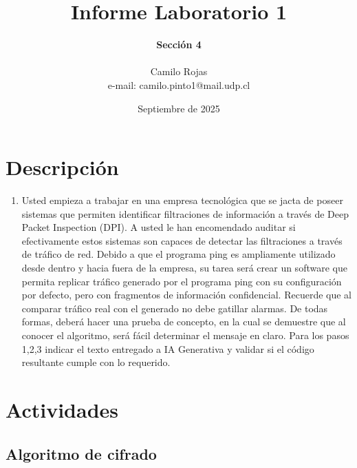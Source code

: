 \documentclass[letter,12pt]{article}
\begin{document}
%
   \title{\Huge{Informe Laboratorio 1}}

   \author{\textbf{Sección 4} \\  \\Camilo Rojas \\ e-mail: camilo.pinto1@mail.udp.cl}
          
   \date{Septiembre de 2025}

   \maketitle
   
   \tableofcontents
 
  \newpage
  

\section{Descripción}

\begin{enumerate}
    \item  Usted empieza a trabajar en una empresa tecnológica que se jacta de poseer sistemas que permiten identificar filtraciones de información a través de Deep Packet Inspection (DPI).
    A usted le han encomendado auditar si efectivamente estos sistemas son capaces de detectar las filtraciones a través de tráfico de red. Debido a que el programa ping es ampliamente utilizado desde dentro y hacia fuera de la empresa, su tarea será crear un software que permita replicar tráfico generado por el programa ping con su configuración por defecto, pero con fragmentos de información confidencial. Recuerde que al comparar tráfico real con el generado no debe gatillar alarmas.
    De todas formas, deberá hacer una prueba de concepto, en la cual se demuestre que al conocer el algoritmo, será fácil determinar el mensaje en claro.
    Para los pasos 1,2,3 indicar el texto entregado a IA Generativa y validar si el código resultante cumple con lo requerido.
\end{enumerate}


\section{Actividades}


\subsection{Algoritmo de cifrado}
\end{document}
